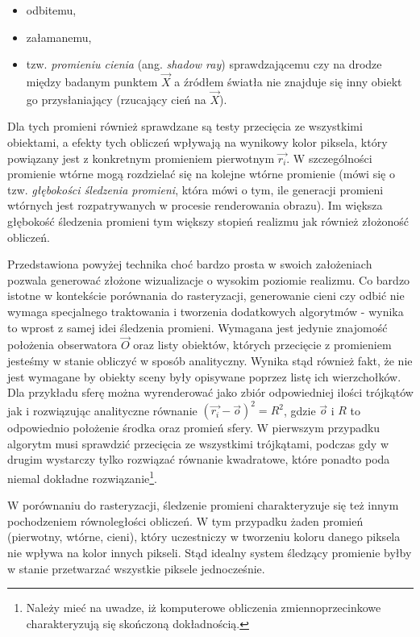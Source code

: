 \begin{itemize}
\item odbitemu,
\item załamanemu,
\item tzw. \textit{promieniu cienia} (ang. \textit{shadow ray}) sprawdzającemu czy na drodze między badanym punktem $\vec{X}$ a źródłem światła nie znajduje się inny obiekt go przysłaniający (rzucający cień na $\vec{X}$).
\end{itemize}
Dla tych promieni również sprawdzane są testy przecięcia ze wszystkimi obiektami, a efekty tych obliczeń wpływają na wynikowy kolor piksela, który powiązany jest z konkretnym promieniem pierwotnym $\vec{r_i}$. W szczególności promienie wtórne mogą rozdzielać się na kolejne wtórne promienie (mówi się o tzw. \textit{głębokości śledzenia promieni}, która mówi o tym, ile generacji promieni wtórnych jest rozpatrywanych w procesie renderowania obrazu). Im większa głębokość śledzenia promieni tym większy stopień realizmu jak również złożoność obliczeń.

Przedstawiona powyżej technika choć bardzo prosta w swoich założeniach pozwala generować złożone wizualizacje o wysokim poziomie realizmu. Co bardzo istotne w kontekście porównania do rasteryzacji, generowanie cieni czy odbić nie wymaga specjalnego traktowania i tworzenia dodatkowych algorytmów - wynika to wprost z samej idei śledzenia promieni. Wymagana jest jedynie znajomość położenia obserwatora $\vec{O}$ oraz listy obiektów, których przecięcie z promieniem jesteśmy w stanie obliczyć w sposób analityczny. Wynika stąd również fakt, że nie jest wymagane by obiekty sceny były opisywane poprzez listę ich wierzchołków. Dla przykładu sferę można wyrenderować jako zbiór odpowiedniej ilości trójkątów jak i rozwiązując analityczne równanie $(\vec{r_i} - \vec{o})^2 = R^2$, gdzie $\vec{o}$ i $R$ to odpowiednio położenie środka oraz promień sfery. W pierwszym przypadku algorytm musi sprawdzić przecięcia ze wszystkimi trójkątami, podczas gdy w drugim wystarczy tylko rozwiązać równanie kwadratowe, które ponadto poda niemal dokładne rozwiązanie\footnote{Należy mieć na uwadze, iż komputerowe obliczenia zmiennoprzecinkowe charakteryzują się skończoną dokładnością.}. 

W porównaniu do rasteryzacji, śledzenie promieni charakteryzuje się też innym pochodzeniem równoległości obliczeń. W tym przypadku żaden promień (pierwotny, wtórne, cieni), który uczestniczy w tworzeniu koloru danego piksela nie wpływa na kolor innych pikseli. Stąd idealny system śledzący promienie byłby w stanie przetwarzać wszystkie piksele jednocześnie.

